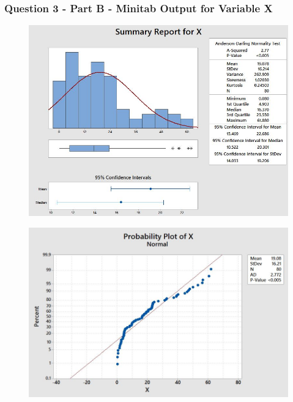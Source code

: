 \documentclass[a4paper,12pt]{article}
\begin{document}
\subsubsection*{Question 3 - Part B - Minitab Output for Variable X}
\begin{figure}[h!]
\centering
\includegraphics[width=0.99\linewidth]{TestingNormality/NormalityTesting1}
\end{figure}
\begin{figure}[h!]
	\centering
\includegraphics[width=0.99\linewidth]{TestingNormality/NormalityTesting2}
\end{figure}

\newpage
\end{document}
